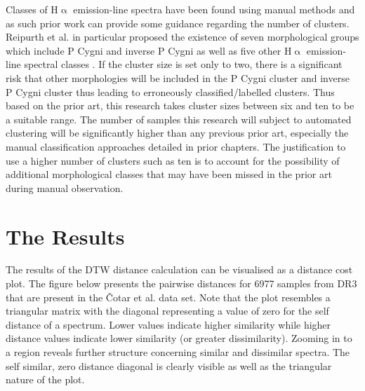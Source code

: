 Classes of H$\upalpha$ emission-line spectra have been found using manual methods and as such prior work can provide some guidance regarding the number of clusters. Reipurth et al. in particular proposed the existence of seven morphological groups which include P Cygni and inverse P Cygni as well as five other H$\upalpha$ emission-line spectral classes \cite{reipurth1996hupalpha}. If the cluster size is set only to two, there is a significant risk that other morphologies will be included in the P Cygni cluster and inverse P Cygni cluster thus leading to erroneously classified/labelled clusters. Thus based on the prior art, this research takes cluster sizes between six and ten to be a suitable range. The number of samples this research will subject to automated clustering will be significantly higher than any previous prior art, especially the manual classification approaches detailed in prior chapters. The justification to use a higher number of clusters such as ten is to account for the possibility of additional morphological classes that may have been missed in the prior art during manual observation. 

\section{The Results}

The results of the DTW distance calculation can be visualised as a distance cost plot. The figure below presents the pairwise distances for 6977 samples from DR3 that are present in the Čotar et al. data set. Note that the plot resembles a triangular matrix with the diagonal representing a value of zero for the self distance of a spectrum. Lower values indicate higher similarity while higher distance values indicate lower similarity (or greater dissimilarity). Zooming in to a region reveals further structure concerning similar and dissimilar spectra. The self similar, zero distance diagonal is clearly visible as well as the triangular nature of the plot.

